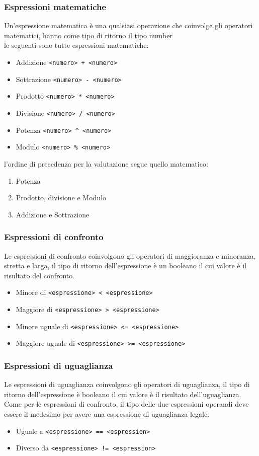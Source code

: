 \subsubsection{Espressioni matematiche}
Un'espressione matematica è una qualsiasi operazione che coinvolge gli operatori matematici,
hanno come tipo di ritorno il tipo number
\\
le seguenti sono tutte espressioni matematiche:
\begin{itemize}
    \item Addizione \verb|<numero> + <numero>|
    \item Sottrazione \verb|<numero> - <numero>|
    \item Prodotto \verb|<numero> * <numero>|
    \item Divisione \verb|<numero> / <numero>|
    \item Potenza \verb|<numero> ^ <numero>|
    \item Modulo \verb|<numero> % <numero>|
\end{itemize}
l'ordine di precedenza per la valutazione segue quello matematico:
\begin{enumerate}
    \item Potenza
    \item Prodotto, divisione e Modulo
    \item Addizione e Sottrazione
\end{enumerate}

\subsubsection{Espressioni di confronto}
Le espressioni di confronto coinvolgono gli operatori di maggioranza e minoranza, stretta e larga,
il tipo di ritorno dell'espressione è un booleano il cui valore è il risultato del confronto.
\begin{itemize}
    \item Minore di \verb|<espressione> < <espressione>|
    \item Maggiore di \verb|<espressione> > <espressione>|
    \item Minore uguale di \verb|<espressione> <= <espressione>|
    \item Maggiore uguale di \verb|<espressione> >= <espressione>|
\end{itemize}

\subsubsection{Espressioni di uguaglianza}
Le espressioni di uguaglianza coinvolgono gli operatori di uguaglianza, 
il tipo di ritorno dell'espressione è booleano il cui valore è il risultato dell'uguaglianza. 
\\
Come per le espressioni di confronto, il tipo delle due espressioni operandi deve essere il medesimo
per avere una espressione di uguaglianza legale.
\begin{itemize}
    \item Uguale a \verb|<espressione> == <espression>|
    \item Diverso da \verb|<espressione> != <espression>|
\end{itemize}

